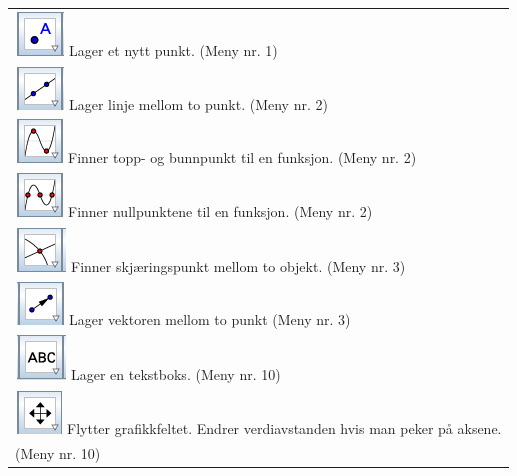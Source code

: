 \begin{tabular}{@{}l}
	\,\includegraphics[scale=0.4]{fig/pkt} Lager et nytt punkt. (Meny nr. 1) \\
	\,\includegraphics[scale=0.4]{fig/lin} Lager linje mellom to punkt. (Meny nr. 2)\\	
	\,\includegraphics[scale=0.4]{fig/ekst} Finner topp- og bunnpunkt til en funksjon. (Meny nr. 2)\\
	\,\includegraphics[scale=0.4]{fig/nul} Finner nullpunktene til en funksjon. (Meny nr. 2)	\\
	\,\includegraphics[scale=0.4]{fig/skj} Finner skjæringspunkt mellom to objekt. (Meny nr. 3)\\	
	\,\includegraphics[scale=0.4]{fig/vek} Lager vektoren mellom to punkt (Meny nr. 3)\\		
	\,\includegraphics[scale=0.4]{fig/tekst} Lager en tekstboks. (Meny nr. 10)\\		
	\,\includegraphics[scale=0.4]{fig/flytt} Flytter grafikkfeltet. Endrer verdiavstanden hvis man peker på aksene. \\
	\hspace{1cm}(Meny nr. 10)\\			
\end{tabular}
